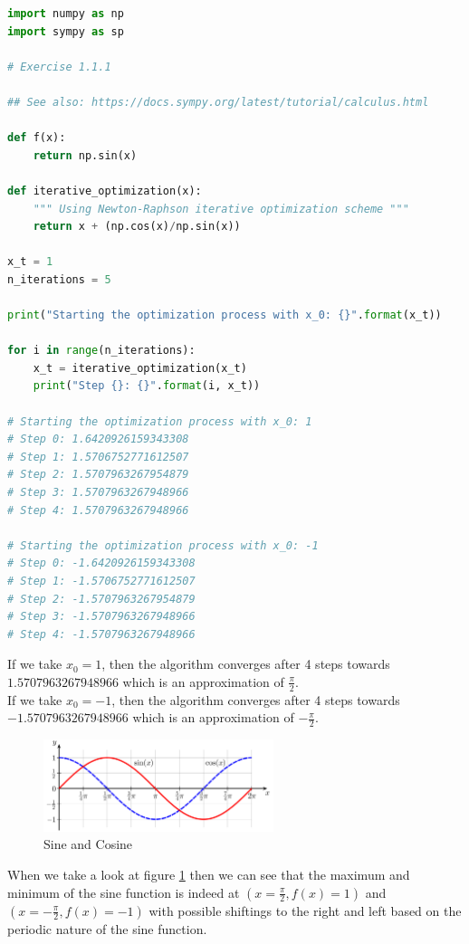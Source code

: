 \documentclass[a4paper]{article}
\begin{document}
\begin{lstlisting}[language=Python]
import numpy as np
import sympy as sp

# Exercise 1.1.1

## See also: https://docs.sympy.org/latest/tutorial/calculus.html

def f(x):
    return np.sin(x)

def iterative_optimization(x):
    """ Using Newton-Raphson iterative optimization scheme """
    return x + (np.cos(x)/np.sin(x))

x_t = 1
n_iterations = 5

print("Starting the optimization process with x_0: {}".format(x_t))

for i in range(n_iterations):
    x_t = iterative_optimization(x_t)
    print("Step {}: {}".format(i, x_t))
    
# Starting the optimization process with x_0: 1
# Step 0: 1.6420926159343308
# Step 1: 1.5706752771612507
# Step 2: 1.5707963267954879
# Step 3: 1.5707963267948966
# Step 4: 1.5707963267948966

# Starting the optimization process with x_0: -1
# Step 0: -1.6420926159343308
# Step 1: -1.5706752771612507
# Step 2: -1.5707963267954879
# Step 3: -1.5707963267948966
# Step 4: -1.5707963267948966
\end{lstlisting}



If we take $x_0 = 1$, then the algorithm converges after 4 steps towards $1.5707963267948966$ which is an approximation of $\frac{\pi}{2}$.\\ 
If we take $x_0 = -1$, then the algorithm converges after 4 steps towards $-1.5707963267948966$ which is an approximation of $-\frac{\pi}{2}$.

\begin{figure}[H]
\center
\includegraphics[width=0.6\textwidth]{Images/sine_cosine.png}
\caption{Sine and Cosine}
\label{Fig:sine-cosine}
\end{figure}

When we take a look at figure \ref{Fig:sine-cosine} then we can see that the maximum and minimum of the sine function is indeed at $(x = \frac{\pi}{2}, f(x) = 1)$ and $(x = -\frac{\pi}{2}, f(x) = -1)$ with possible shiftings to the right and left based on the periodic nature of the sine function.\\
\end{document}
